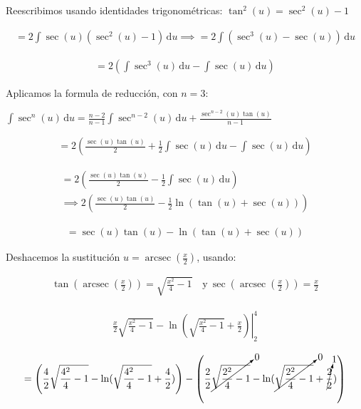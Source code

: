 \documentclass[12pt]{article}
\DeclareMathOperator{\arcsec}{arcsec}
\begin{document}
\noindent Reescribimos usando identidades trigonométricas: $\tan^2(u)=\sec^2(u)-1$

\begin{align*}
	= 2\int \sec(u)(\sec^2(u)-1)\, \mathrm{d}u \implies = 2\int (\sec^3(u)-\sec(u))\, \mathrm{d}u
\end{align*}

\begin{align*}
	= 2\left(\int \sec^3(u)\, \mathrm{d}u - \int \sec(u)\, \mathrm{d}u\right)
\end{align*}

\noindent Aplicamos la formula de reducción, con $n=3$:

\begin{center}
	$\int \sec^n(u)\, \mathrm{d}u = \frac{n-2}{n-1} \int \sec^{n-2}(u)\, \mathrm{d}u + \frac{\sec^{n-2}(u)\tan(u)}{n-1}$
\end{center}

\begin{align*}
	= 2\left(\frac{\sec(u)\tan(u)}{2} + \frac{1}{2} \int \sec(u)\, \mathrm{d}u - \int \sec(u)\, \mathrm{d}u\right)
\end{align*}

\begin{multline*}
	= 2\left(\frac{\sec(u)\tan(u)}{2} - \frac{1}{2}\int \sec(u)\, \mathrm{d}u\right) \\\implies 2\left(\frac{\sec(u)\tan(u)}{2} - \frac{1}{2}\ln(\tan(u)+\sec(u))\right)
\end{multline*}

\begin{align*}
	= \sec(u)\tan(u) - \ln(\tan(u)+\sec(u))
\end{align*}

\noindent Deshacemos la sustitución $u = \arcsec(\frac{x}{2})$, usando:

\begin{align*}
	\tan\left(\arcsec\left(\frac{x}{2}\right)\right)=\sqrt{\frac{x^2}{4}-1}\quad \mathrm{y} \
	\sec\left(\arcsec\left(\frac{x}{2}\right)\right)=\frac{x}{2}
\end{align*}

\begin{align*}
	\left.\frac{x}{2}\sqrt{\frac{x^2}{4}-1}-\ln\left(\sqrt{\frac{x^2}{4}-1}+\frac{x}{2}\right)\right|_2^4
\end{align*}

\begin{align*}
	=\left(\frac{4}{2}\sqrt{\frac{4^2}{4}-1} - \ln(\sqrt{\frac{4^2}{4}-1}+\frac{4}{2})\right) - \left(\frac{2}{2}\cancelto{0}{\sqrt{\frac{2^2}{4}-1}} - \ln(\cancelto{0}{\sqrt{\frac{2^2}{4}-1}}+\cancelto{1}{\frac{2}{2}})\right)
\end{align*}
\end{document}

